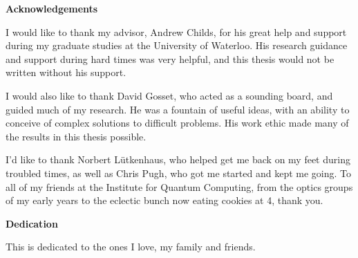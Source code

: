\begin{center}\textbf{Acknowledgements}\end{center}

I would like to thank my advisor, Andrew Childs, for his great help and support during my graduate studies at the University of Waterloo.  His research guidance and support during hard times was very helpful, and this thesis would not be written without his support.

I would also like to thank David Gosset, who acted as a sounding board, and guided much of my research.  He was a fountain of useful ideas, with an ability to conceive of complex solutions to difficult problems.  His work ethic made many of the results in this thesis possible.

I'd like to thank Norbert L\"{u}tkenhaus, who helped get me back on my feet during troubled times, as well as Chris Pugh, who got me started and kept me going.  To all of my friends at the Institute for Quantum Computing, from the optics groups of my early years to the eclectic bunch now eating cookies at 4, thank you.
\cleardoublepage


\begin{center}\textbf{Dedication}\end{center}

This is dedicated to the ones I love, my family and friends.
\cleardoublepage


\renewcommand\contentsname{Table of Contents}
\tableofcontents
\cleardoublepage
{}




\listoffigures
\cleardoublepage
{}		%





